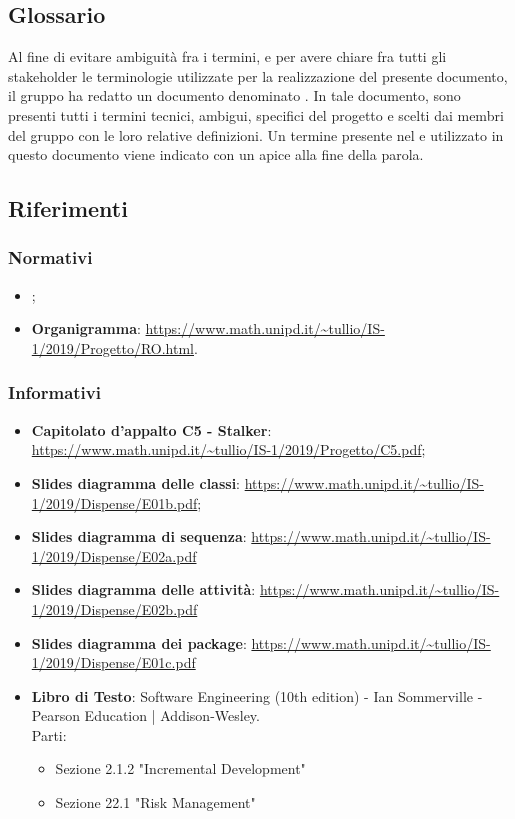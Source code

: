 \subsection{Glossario}
Al fine di evitare ambiguità fra i termini, e per avere chiare fra tutti gli stakeholder le terminologie utilizzate per la realizzazione del presente documento, il gruppo \Gruppo{} ha redatto un documento denominato .
In tale documento, sono presenti tutti i termini tecnici, ambigui, specifici del progetto e scelti dai membri del gruppo con le loro relative definizioni.
Un termine presente nel  e utilizzato in questo documento viene indicato con un apice  alla fine della parola.

\subsection{Riferimenti}
\subsubsection{Normativi}
\begin{itemize}
    \item {};
    \item \textbf{Organigramma}: \url{https://www.math.unipd.it/~tullio/IS-1/2019/Progetto/RO.html}.
\end{itemize}

\subsubsection{Informativi}
\begin{itemize}
    \item \textbf{Capitolato d'appalto C5 - Stalker}: \url{https://www.math.unipd.it/~tullio/IS-1/2019/Progetto/C5.pdf};
    \item \textbf{Slides diagramma delle classi}: \url{https://www.math.unipd.it/~tullio/IS-1/2019/Dispense/E01b.pdf};
    \item \textbf{Slides diagramma di sequenza}: \url{https://www.math.unipd.it/~tullio/IS-1/2019/Dispense/E02a.pdf}
    \item \textbf{Slides diagramma delle attività}: \url{https://www.math.unipd.it/~tullio/IS-1/2019/Dispense/E02b.pdf}
    \item \textbf{Slides diagramma dei package}: \url{https://www.math.unipd.it/~tullio/IS-1/2019/Dispense/E01c.pdf}
    \item \textbf{Libro di Testo}: Software Engineering (10th edition) - Ian Sommerville - Pearson Education | Addison-Wesley.\\
    Parti:
    \begin{itemize}
        \item Sezione 2.1.2 "Incremental Development"
        \item Sezione 22.1 "Risk Management"
    \end{itemize}
\end{itemize}


